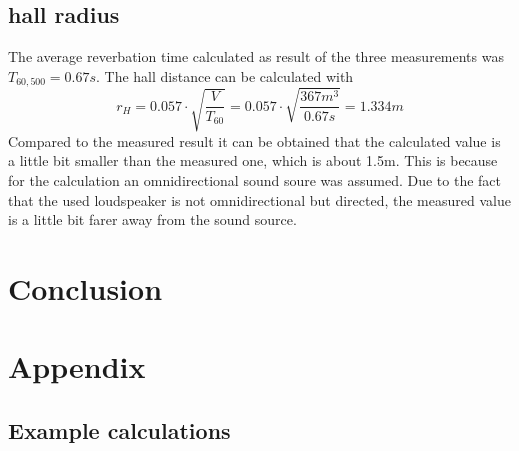 \documentclass{article}
\begin{document}
\subsection{hall radius}
The average reverbation time calculated as result of the three measurements was $T_{60,500}=0.67s$. The hall distance can be calculated with
$$r_H=0.057\cdot\sqrt{\frac{V}{T_{60}}}=0.057\cdot\sqrt{\frac{367m^3}{0.67s}}=1.334m$$
Compared to the measured result it can be obtained that the calculated value is a little bit smaller than the measured one, which is about 1.5m. This is because for the calculation an omnidirectional sound soure was assumed. Due to the fact that the used loudspeaker is not omnidirectional but directed, the measured value is a little bit farer away from the sound source.

\newpage
\section{Conclusion}
\newpage
\section{Appendix}
\subsection{Example calculations}
\end{document}
